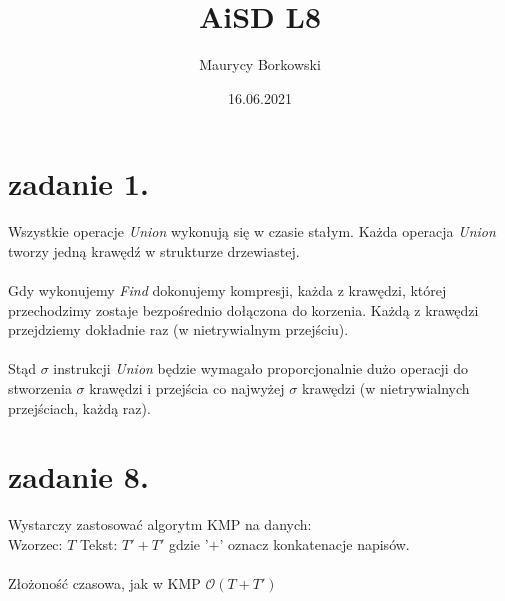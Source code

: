 \documentclass{article}
\title{AiSD L8}
\date{16.06.2021}
\author{Maurycy Borkowski}
\begin{document}
\maketitle
\section{zadanie 1.}
Wszystkie operacje \textit{Union} wykonują się w czasie stałym. Każda operacja \textit{Union} tworzy jedną krawędź w strukturze drzewiastej.\\\\
Gdy wykonujemy \textit{Find} dokonujemy kompresji, każda z krawędzi, której przechodzimy zostaje bezpośrednio dołączona do korzenia. Każdą z krawędzi przejdziemy dokładnie raz (w nietrywialnym przejściu).\\\\
Stąd $\sigma$ instrukcji \textit{Union} będzie wymagało proporcjonalnie dużo operacji do stworzenia $\sigma$ krawędzi i przejścia co najwyżej $\sigma$ krawędzi (w nietrywialnych przejściach, każdą raz).
\section{zadanie 8.}
Wystarczy zastosować algorytm KMP na danych:\\
Wzorzec: $T$
Tekst: $T' + T'$ gdzie '$+$' oznacz konkatenacje napisów.\\\\
Złożoność czasowa, jak w KMP $\mathcal{O}(T+T')$
\end{document}
